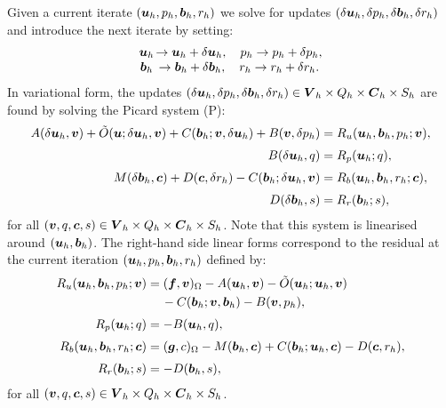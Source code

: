  Given a current iterate $(\boldsymbol u_h,p_h,\boldsymbol b_h,r_h)$  we solve for updates $(\delta \boldsymbol u_h,\delta p_h,\delta \boldsymbol b_h,\delta r_h)$ and introduce the next iterate by setting:
\begin{equation}\nonumber
\begin{array}{cc}
\uu{u}_h& \hspace{-3mm} \rightarrow \uu{u}_h +\delta \uu{u}_h, \quad p_h \rightarrow p_h +\delta p_h,\\
\uu{b}_h& \hspace{-3mm}  \rightarrow \uu{b}_h +\delta \uu{b}_h, \quad r_h \rightarrow r_h +\delta r_h.
\end{array}
\end{equation}
In variational form, the updates $(\delta \boldsymbol u_h,\delta p_h,\delta \boldsymbol b_h,\delta r_h)\in \boldsymbol V_h\times Q_h \times \boldsymbol C_h\times S_h$ are found by solving the Picard system (P):
\begin{equation} \nonumber
\begin{split}
A(\delta\boldsymbol u_h, \boldsymbol v) +\tilde{O}(\boldsymbol u;\delta\boldsymbol u_h,\boldsymbol v)+ C(\boldsymbol b_h;\boldsymbol v,\delta \boldsymbol u_h) + B(\boldsymbol v, \delta p_h) & = R_u(\boldsymbol u_h,\boldsymbol b_h,p_h;\boldsymbol v),\\[.1cm]
B(\delta\boldsymbol u_h,q)&= R_p(\boldsymbol u_h;q), \\[.1cm]
M(\delta \boldsymbol b_h,\boldsymbol c)+
D(\boldsymbol c,\delta r_h)-C(\boldsymbol b_h;\delta \boldsymbol u_h,\boldsymbol v)&= R_b(\boldsymbol u_h,\boldsymbol b_h,r_h;\boldsymbol c),\\[.1cm]
D(\delta \boldsymbol b_h,s)&= R_r(\boldsymbol b_h;s),
\end{split}
\end{equation}
for all $(\boldsymbol v,q,\boldsymbol c,s)\in \boldsymbol V_h\times Q_h \times \boldsymbol C_h\times S_h$. Note that this system is linearised around $(\boldsymbol u_h,\boldsymbol b_h)$. The right-hand side linear forms correspond to the residual at the current iteration $(\boldsymbol u_h,p_h,\boldsymbol b_h,r_h)$ defined by:
\begin{align*}
 R_u(\boldsymbol u_h,\boldsymbol b_h,p_h;\boldsymbol v)&=(\boldsymbol f, \boldsymbol v)_\Omega-A(\boldsymbol u_h,\boldsymbol v)
-  \tilde{O}(\boldsymbol u_h;\boldsymbol u_h,\boldsymbol v) \\  & \hspace{4.2mm}- C(\boldsymbol b_h;\boldsymbol v,\boldsymbol b_h)-B(\boldsymbol v,p_h),\\[.1cm]
R_p(\boldsymbol u_h;q)&=-B(\boldsymbol u_h,q),\\[.1cm]
 R_b(\boldsymbol u_h,\boldsymbol b_h,r_h;\boldsymbol c)&=(\boldsymbol g,c)_\Omega -M(\boldsymbol b_h,\boldsymbol c)
+ C(\boldsymbol b_h;\boldsymbol u_h,\boldsymbol c)-D(\boldsymbol c,r_h),\\[.1cm]
R_r(\boldsymbol b_h;s)&=-D(\boldsymbol b_h,s),
\end{align*}
for all $(\boldsymbol v,q,\boldsymbol c,s)\in \boldsymbol V_h\times Q_h \times \boldsymbol C_h\times S_h$.

